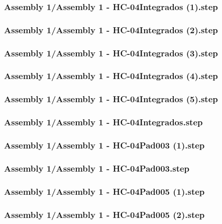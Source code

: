\documentclass[a4paper,12pt]{article}
\begin{document}
\subsubsection{Assembly 1/Assembly 1 - HC-04Integrados (1).step}

\subsubsection{Assembly 1/Assembly 1 - HC-04Integrados (2).step}

\subsubsection{Assembly 1/Assembly 1 - HC-04Integrados (3).step}

\subsubsection{Assembly 1/Assembly 1 - HC-04Integrados (4).step}

\subsubsection{Assembly 1/Assembly 1 - HC-04Integrados (5).step}

\subsubsection{Assembly 1/Assembly 1 - HC-04Integrados.step}

\subsubsection{Assembly 1/Assembly 1 - HC-04Pad003 (1).step}

\subsubsection{Assembly 1/Assembly 1 - HC-04Pad003.step}

\subsubsection{Assembly 1/Assembly 1 - HC-04Pad005 (1).step}

\subsubsection{Assembly 1/Assembly 1 - HC-04Pad005 (2).step}

\end{document}
